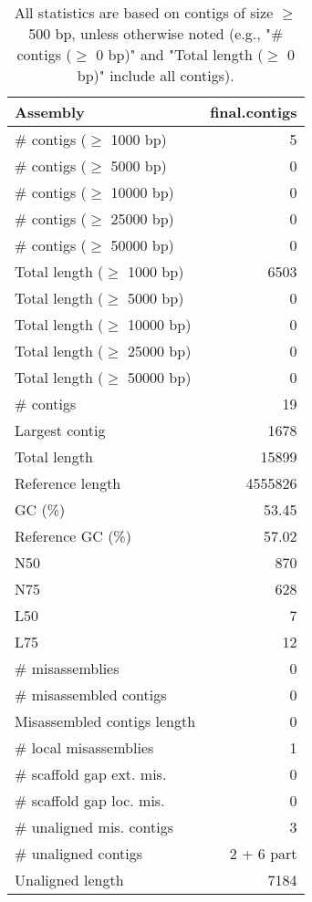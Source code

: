 \documentclass[12pt,a4paper]{article}
\begin{document}
\begin{table}[ht]
\begin{center}
\caption{All statistics are based on contigs of size $\geq$ 500 bp, unless otherwise noted (e.g., "\# contigs ($\geq$ 0 bp)" and "Total length ($\geq$ 0 bp)" include all contigs).}
\begin{tabular}{|l*{1}{|r}|}
\hline
Assembly & final.contigs \\ \hline
\# contigs ($\geq$ 1000 bp) & 5 \\ \hline
\# contigs ($\geq$ 5000 bp) & 0 \\ \hline
\# contigs ($\geq$ 10000 bp) & 0 \\ \hline
\# contigs ($\geq$ 25000 bp) & 0 \\ \hline
\# contigs ($\geq$ 50000 bp) & 0 \\ \hline
Total length ($\geq$ 1000 bp) & 6503 \\ \hline
Total length ($\geq$ 5000 bp) & 0 \\ \hline
Total length ($\geq$ 10000 bp) & 0 \\ \hline
Total length ($\geq$ 25000 bp) & 0 \\ \hline
Total length ($\geq$ 50000 bp) & 0 \\ \hline
\# contigs & 19 \\ \hline
Largest contig & 1678 \\ \hline
Total length & 15899 \\ \hline
Reference length & 4555826 \\ \hline
GC (\%) & 53.45 \\ \hline
Reference GC (\%) & 57.02 \\ \hline
N50 & 870 \\ \hline
N75 & 628 \\ \hline
L50 & 7 \\ \hline
L75 & 12 \\ \hline
\# misassemblies & 0 \\ \hline
\# misassembled contigs & 0 \\ \hline
Misassembled contigs length & 0 \\ \hline
\# local misassemblies & 1 \\ \hline
\# scaffold gap ext. mis. & 0 \\ \hline
\# scaffold gap loc. mis. & 0 \\ \hline
\# unaligned mis. contigs & 3 \\ \hline
\# unaligned contigs & 2 + 6 part \\ \hline
Unaligned length & 7184 \\ \hline

\end{tabular}
\end{center}
\end{table}
\end{document}

